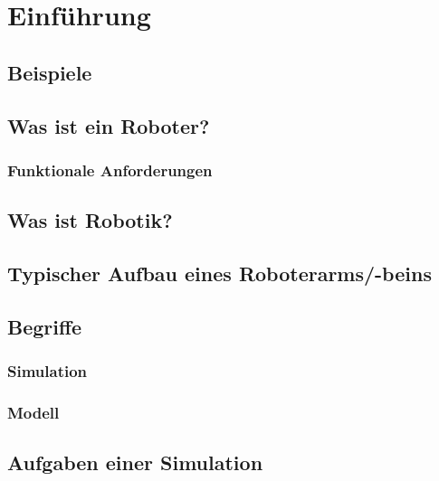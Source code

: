 \chapter{Einführung} %

	\section{Beispiele} %

	\section{Was ist ein Roboter?} %

		\subsection{Funktionale Anforderungen} %

	\section{Was ist Robotik?} %

	\section{Typischer Aufbau eines Roboterarms/-beins} %

	\section{Begriffe} %

		\subsection{Simulation} %

		\subsection{Modell} %

	\section{Aufgaben einer Simulation} %

